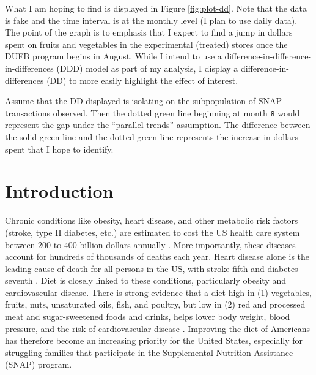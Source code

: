 \documentclass[12pt,letterpaperpaper,]{book}
\begin{document}
What I am hoping to find is displayed in Figure \ref{fig:plot-dd}. Note
that the data is fake and the time interval is at the monthly level (I
plan to use daily data). The point of the graph is to emphasis that I
expect to find a jump in dollars spent on fruits and vegetables in the
experimental (treated) stores once the DUFB program begins in August.
While I intend to use a difference-in-difference-in-differences (DDD)
model as part of my analysis, I display a difference-in-differences (DD)
to more easily highlight the effect of interest.

Assume that the DD displayed is isolating on the subpopulation of SNAP
transactions observed. Then the dotted green line beginning at month
\texttt{8} would represent the gap under the ``parallel trends''
assumption. The difference between the solid green line and the dotted
green line represents the increase in dollars spent that I hope to
identify.

\section*{Introduction}\label{intro-1}

Chronic conditions like obesity, heart disease, and other metabolic risk
factors (stroke, type II diabetes, etc.) are estimated to cost the US
health care system between 200 to 400 billion dollars annually
\citep{cawley_medical_2012, chatterjee_checkup_2014}. More importantly,
these diseases account for hundreds of thousands of deaths each year.
Heart disease alone is the leading cause of death for all persons in the
US, with stroke fifth and diabetes seventh
\citep{national_center_for_health_statistics_health_2015}. Diet is
closely linked to these conditions, particularly obesity and
cardiovascular disease. There is strong evidence that a diet high in (1)
vegetables, fruits, nuts, unsaturated oils, fish, and poultry, but low
in (2) red and processed meat and sugar-sweetened foods and drinks,
helps lower body weight, blood pressure, and the risk of cardiovascular
disease
\citep{mente_systematic_2009, nutrition_evidence_library_series_2014}.
Improving the diet of Americans has therefore become an increasing
priority for the United States, especially for struggling families that
participate in the Supplemental Nutrition Assistance (SNAP) program.
\end{document}
